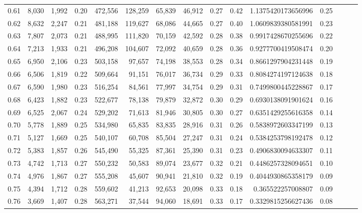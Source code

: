 \begin{tabular}{rrrrrrrrrrrrrrr}
0.61 &   8,030 &  1,992 &  0.20 &  472,556 &  128,259 &   65,839 &   46,912 &  0.27 &  0.42 &    1.1375420173656996 &      0.25 \\
0.62 &   8,632 &  2,247 &  0.21 &  481,188 &  119,627 &   68,086 &   44,665 &  0.27 &  0.40 &    1.0609839380581991 &      0.23 \\
0.63 &   7,807 &  2,073 &  0.21 &  488,995 &  111,820 &   70,159 &   42,592 &  0.28 &  0.38 &    0.9917428670255696 &      0.22 \\
0.64 &   7,213 &  1,933 &  0.21 &  496,208 &  104,607 &   72,092 &   40,659 &  0.28 &  0.36 &    0.9277700419508474 &      0.20 \\
0.65 &   6,950 &  2,106 &  0.23 &  503,158 &   97,657 &   74,198 &   38,553 &  0.28 &  0.34 &    0.8661297904231448 &      0.19 \\
0.66 &   6,506 &  1,819 &  0.22 &  509,664 &   91,151 &   76,017 &   36,734 &  0.29 &  0.33 &    0.8084274197124638 &      0.18 \\
0.67 &   6,590 &  1,980 &  0.23 &  516,254 &   84,561 &   77,997 &   34,754 &  0.29 &  0.31 &    0.7499800445228867 &      0.17 \\
0.68 &   6,423 &  1,882 &  0.23 &  522,677 &   78,138 &   79,879 &   32,872 &  0.30 &  0.29 &    0.6930138091901624 &      0.16 \\
0.69 &   6,525 &  2,067 &  0.24 &  529,202 &   71,613 &   81,946 &   30,805 &  0.30 &  0.27 &    0.6351429255616358 &      0.14 \\
0.70 &   5,778 &  1,889 &  0.25 &  534,980 &   65,835 &   83,835 &   28,916 &  0.31 &  0.26 &    0.5838972603347199 &      0.13 \\
0.71 &   5,127 &  1,669 &  0.25 &  540,107 &   60,708 &   85,504 &   27,247 &  0.31 &  0.24 &    0.5384253798192478 &      0.12 \\
0.72 &   5,383 &  1,857 &  0.26 &  545,490 &   55,325 &   87,361 &   25,390 &  0.31 &  0.23 &    0.4906830094633307 &      0.11 \\
0.73 &   4,742 &  1,713 &  0.27 &  550,232 &   50,583 &   89,074 &   23,677 &  0.32 &  0.21 &    0.4486257328094651 &      0.10 \\
0.74 &   4,976 &  1,867 &  0.27 &  555,208 &   45,607 &   90,941 &   21,810 &  0.32 &  0.19 &    0.4044930865358179 &      0.09 \\
0.75 &   4,394 &  1,712 &  0.28 &  559,602 &   41,213 &   92,653 &   20,098 &  0.33 &  0.18 &     0.365522257008807 &      0.09 \\
0.76 &   3,669 &  1,407 &  0.28 &  563,271 &   37,544 &   94,060 &   18,691 &  0.33 &  0.17 &    0.3329815256627436 &      0.08 \\

\end{tabular}
